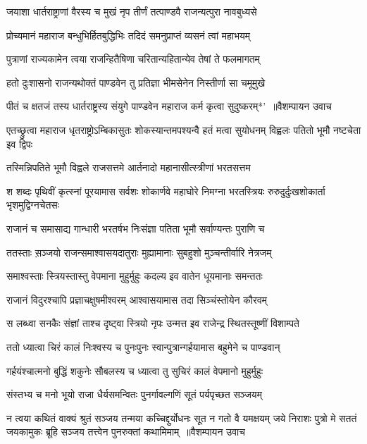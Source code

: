 \twolineshloka
{जयाशा धार्तराष्ट्राणां वैरस्य च मुखं नृप}
{तीर्णं तत्पाण्डवै राजन्यत्पुरा नावबुध्यसे}


\twolineshloka
{प्रोच्यमानं महाराज बन्धुभिर्हितबुद्धिभिः}
{तदिदं समनुप्राप्तं व्यसनं त्वां महाभयम्}


\twolineshloka
{पुत्राणां राज्यकामेन त्वया राजन्हितैषिणा}
{चरितान्यहितान्येव तेषां ते फलमागतम्}


\twolineshloka
{हतो दुःशासनो राजन्यथोक्तं पाण्डवेन तु}
{प्रतिज्ञा भीमसेनेन निस्तीर्णा सा चमूमुखे}


\threelineshloka
{पीतं च क्षतजं तस्य धार्तराष्ट्रस्य संयुगे}
{पाण्डवेन महाराज कर्म कृत्वा सुदुष्करम्*' ॥वैशम्पायन उवाच}
{}


\threelineshloka
{एतच्छ्रुत्वा महाराज धृतराष्ट्रोऽम्बिकासुतः}
{शोकस्यान्तमपश्यन्वै हतं मत्वा सुयोधनम्}
{विह्वलः पतितो भूमौ नष्टचेता इव द्विपः}


\twolineshloka
{तस्मिन्निपतिते भूमौ विह्वले राजसत्तमे}
{आर्तनादो महानासीत्स्त्रीणां भरतसत्तम}


श शब्दः पृथिवीं कृत्स्नां पूरयामास सर्वशः
\twolineshloka
{शोकार्णवे महाघोरे निमग्ना भरतस्त्रियः}
{रुरुदुर्दुःखशोकार्ता भृशमुद्विग्नचेतसः}


\twolineshloka
{राजानं च समासाद्य गान्धारी भरतर्षभ}
{निःसंज्ञा पतिता भूमौ सर्वाण्यन्तः पुराणि च}


\twolineshloka
{ततस्ताः स़ञ्जयो राजन्समाश्वासयदातुराः}
{मुह्यामानाः सुबहुशो मुञ्चन्तीर्वारि नेत्रजम्}


\twolineshloka
{समाश्वस्ताः स्त्रियस्तास्तु वेपमाना मुहुर्मुहुः}
{कदल्य इव वातेन धूयमानाः समन्ततः}


\twolineshloka
{राजानं विदुरश्चापि प्रज्ञाचक्षुषमीश्वरम्}
{आश्वासयामास तदा सिञ्चंस्तोयेन कौरवम्}


\twolineshloka
{स लब्ध्वा सनकैः संज्ञां ताश्च दृष्ट्वा स्त्रियो नृपः}
{उन्मत्त इव राजेन्द्र स्थितस्तूष्णीं विशाम्पते}


\twolineshloka
{ततो ध्यात्वा चिरं कालं निःश्वस्य च पुनःपुनः}
{स्वान्पुत्रान्गर्हयामास बहुमेने च पाण्डवान्}


\twolineshloka
{गर्हयंश्चात्मनो बुद्धिं शकुनेः सौबलस्य च}
{ध्यात्वा तु सुचिरं कालं वेपमानो मुहुर्मुहुः}


\twolineshloka
{संस्तभ्य च मनो भूयो राजा धैर्यसमन्वितः}
{पुनर्गावल्गणिं सूतं पर्यपृच्छत सञ्जयम्}


न त्वया कथितं वाक्यं श्रुतं सञ्जय तन्मया
\fourlineindentedshloka
{कच्चिद्दुर्योधनः सूत न गतो वै यमक्षयम्}
{जये निराशः पुत्रो मे सततं जयकामुकः}
{ब्रूहि सञ्जय तत्त्वेन पुनरुक्तां कथामिमाम् ॥वैशम्पायन उवाच}
{}


